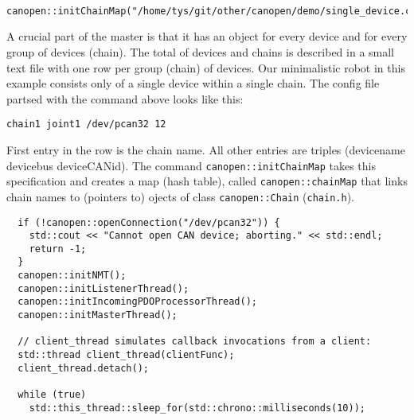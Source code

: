 \begin{verbatim}
 canopen::initChainMap("/home/tys/git/other/canopen/demo/single_device.csv");
\end{verbatim}
A crucial part of the master is that it has an object for every device and for every group of devices (chain). The total of devices and chains is described in a small text file with one row per group (chain) of devices. Our minimalistic robot in this example consists only of a single device within a single chain. The config file partsed with the command above looks like this:

\begin{verbatim}
chain1 joint1 /dev/pcan32 12
\end{verbatim}
First entry in the row is the chain name. All other entries are triples (devicename devicebus deviceCANid). The command \texttt{canopen::initChainMap} takes this specification and creates a map (hash table), called \texttt{canopen::chainMap} that links chain names to (pointers to) ojects of class \texttt{canopen::Chain} (\texttt{chain.h}).


\begin{verbatim}
  if (!canopen::openConnection("/dev/pcan32")) {
    std::cout << "Cannot open CAN device; aborting." << std::endl;
    return -1;
  } 
  canopen::initNMT();
  canopen::initListenerThread();
  canopen::initIncomingPDOProcessorThread();
  canopen::initMasterThread();

  // client_thread simulates callback invocations from a client:
  std::thread client_thread(clientFunc);
  client_thread.detach();
    
  while (true)
    std::this_thread::sleep_for(std::chrono::milliseconds(10));
\end{verbatim}
 




